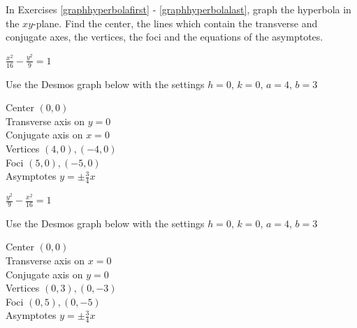 \documentclass{ximera}
\begin{document}
	\author{Stitz-Zeager}



\label{ExercisesforHyperbolas}

\begin{question}
    In Exercises \ref{graphhyperbolafirst} - \ref{graphhyperbolalast}, graph the hyperbola in the $xy$-plane.  Find the center, the lines which contain the transverse and conjugate axes, the vertices, the foci and the equations of the asymptotes.


\begin{problem}\label{graphhyperbolafirst} \label{oddhypeone}
    $\frac{x^{2}}{16} - \frac{y^{2}}{9} = 1$ 

\begin{solution}
Use the Desmos graph below with the settings $h=0,\,k=0,\,a=4,\,b=3$

\begin{center} 
\end{center}
Center $(0, 0)$\\
Transverse axis on $y = 0$\\
Conjugate axis on $x = 0$\\
Vertices $(4, 0), (-4, 0)$\\
Foci $(5, 0), (-5, 0)$\\
Asymptotes $y = \pm \frac{3}{4} x$\\
\end{solution}
    
\end{problem}

\begin{problem}
    $\frac{y^{2}}{9} - \frac{x^{2}}{16} = 1$ 

\begin{solution}
Use the Desmos graph below with the settings $h=0,\,k=0,\,a=4,\,b=3$

\begin{center} 
\end{center}
Center $(0, 0)$\\
Transverse axis on $x = 0$\\
Conjugate axis on $y = 0$\\
Vertices $(0, 3), (0, -3)$\\
Foci $(0, 5), (0, -5)$\\
Asymptotes $y = \pm \frac{3}{4} x$\\
\end{solution}
    

\end{problem}
\end{question}
\end{document}
